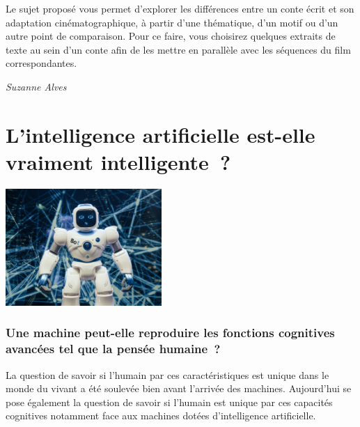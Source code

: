 \documentclass[
  10pt,
  french,
  a5paper,
  openany]{book}
\newenvironment{signature}{\begin{flushright}}{\end{flushright}}
\begin{document}
\clearpage

Le sujet proposé vous permet d'explorer les différences entre un conte écrit et son adaptation cinématographique, à partir d'une thématique, d'un motif ou d'un autre point de comparaison. Pour ce faire, vous choisirez quelques extraits de texte au sein d'un conte afin de les mettre en parallèle avec les séquences du film correspondantes.

\begin{signature}
\emph{Suzanne Alves}

\end{signature}

\hypertarget{lintelligence-artificielle-est-elle-vraiment-intelligente}{%
\chapter{\texorpdfstring{L'intelligence artificielle \linebreak est-elle vraiment intelligente~?}{L'intelligence artificielle est-elle vraiment intelligente~?}}\label{lintelligence-artificielle-est-elle-vraiment-intelligente}}

\begin{center}
\includegraphics[width=\textwidth,height=12em]{images/intelligence-artificelle.jpeg}

\end{center}

\hypertarget{une-machine-peut-elle-reproduire-les-fonctions-cognitives-avancuxe9es-tel-que-la-pensuxe9e-humaine}{%
\subsection*{Une machine peut-elle reproduire les fonctions cognitives avancées tel que la pensée humaine~?}\label{une-machine-peut-elle-reproduire-les-fonctions-cognitives-avancuxe9es-tel-que-la-pensuxe9e-humaine}}

La question de savoir si l'humain par ces caractéristiques est unique dans le monde du vivant a été soulevée bien avant l'arrivée des machines. Aujourd'hui se pose également la question de savoir si l'humain est unique par ces capacités cognitives notamment face aux machines dotées d'intelligence artificielle.
\end{document}
